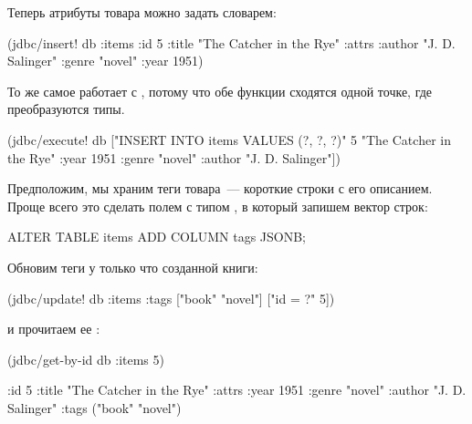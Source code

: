 Теперь атрибуты товара можно задать словарем:

\begin{english}
  \begin{clojure}
(jdbc/insert! db :items
              {:id 5
               :title "The Catcher in the Rye"
               :attrs {:author "J. D. Salinger"
                       :genre "novel"
                       :year 1951}})
  \end{clojure}
\end{english}

То же самое работает с , потому что обе функции сходятся одной точке, где преобразуются типы.

\begin{english}
  \begin{clojure}
(jdbc/execute!
  db
  ["INSERT INTO items VALUES (?, ?, ?)"
  5
  "The Catcher in the Rye"
  {:year 1951 :genre "novel"
   :author "J. D. Salinger"}])
  \end{clojure}
\end{english}

Предположим, мы храним теги товара~--- короткие строки с его описанием. Проще всего это сделать полем  с типом , в который запишем вектор строк:

\begin{english}
  \begin{sql}
ALTER TABLE items ADD COLUMN tags JSONB;
  \end{sql}
\end{english}

Обновим теги у только что созданной книги:

\begin{english}
  \begin{clojure}
(jdbc/update! db :items
              {:tags ["book" "novel"]}
              ["id = ?" 5])
  \end{clojure}
\end{english}

\noindent
и прочитаем ее :

\begin{english}
  \begin{clojure/lines}
(jdbc/get-by-id db :items 5)

{:id 5
 :title "The Catcher in the Rye"
 :attrs {:year 1951 :genre "novel"
         :author "J. D. Salinger"}
 :tags ("book" "novel")}
  \end{clojure/lines}
\end{english}

